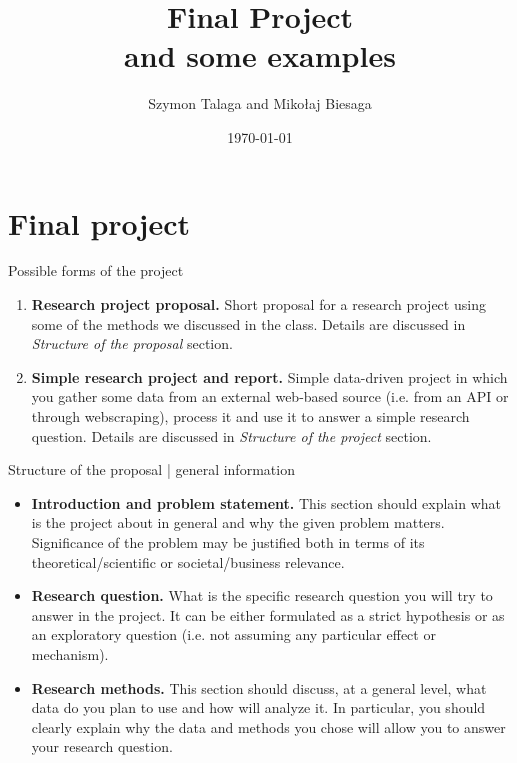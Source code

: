 \title[Final Project]{
    Final Project \\
    \small{and some examples}
}
\author[]{Szymon Talaga and Mikołaj Biesaga} %
\date{\today} %

\frame{\titlepage}

\section{Final project}

\begin{frame}{Possible forms of the project}
\begin{enumerate}
    \item \textbf{Research project proposal.}
    Short proposal for a research project using some of
    the methods we discussed in the class. Details are discussed
    in \textit{Structure of the proposal} section.
    \item \textbf{Simple research project and report.}
    Simple data-driven project in which you gather some data from an external
    web-based source (i.e. from an API or through webscraping), process it
    and use it to answer a simple research question. Details are discussed in
    \textit{Structure of the project} section.
\end{enumerate}
\end{frame}

\begin{frame}{Structure of the proposal | general information}
\begin{itemize}
    \item \textbf{Introduction and problem statement.}
    This section should explain what is the project about in general
    and why the given problem matters. Significance of the problem may
    be justified both in terms of its theoretical/scientific
    or societal/business relevance.
    \item \textbf{Research question.}
    What is the specific research question you will try to answer in the
    project. It can be either formulated as a strict hypothesis or as an
    exploratory question (i.e. not assuming any particular effect or mechanism).
    \item \textbf{Research methods.}
    This section should discuss, at a general level, what data do you plan
    to use and how will analyze it. In particular, you should clearly explain
    why the data and methods you chose will allow you to answer your research
    question.
\end{itemize}
\end{frame}

